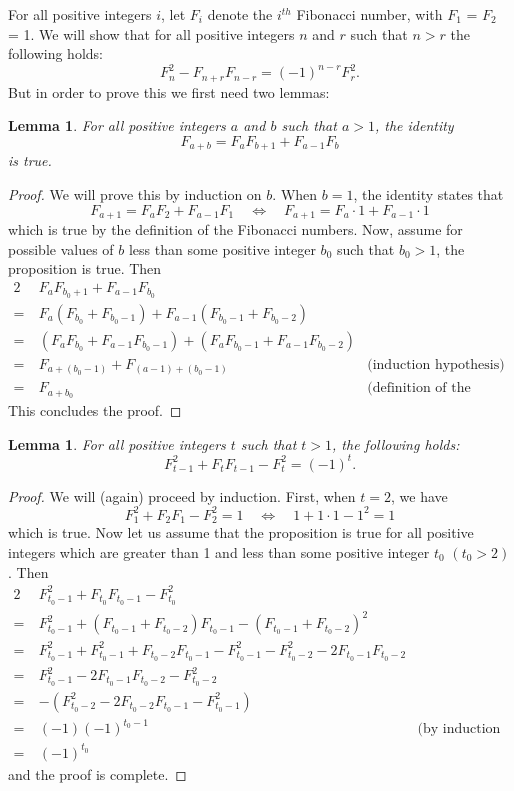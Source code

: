 \documentclass[12pt]{article}
\newtheorem{lem}[thm]{Lemma}
\theoremstyle{definition}
\theoremstyle{remark}
\numberwithin{equation}{section}
\begin{document}
For all positive integers $i$, let $F_{i}$ denote the $i^{th}$ Fibonacci number, with $F_{1}$ = $F_{2}$ = 1. We will show that for all positive integers $n$ and $r$ such that $n > r$ the following holds:
$$F_{n}^2 - F_{n + r}F_{n - r}=( - 1)^{n - r}F_{r}^2.$$
But in order to prove this we first need two lemmas: \begin{lem}
For all positive integers $a$ and $b$ such that $a>1$, the identity
$$F_{a + b} = F_{a}F_{b + 1} + F_{a - 1}F_{b}$$ is true. \end{lem}
\begin{proof} 
We will prove this by induction on $b$. When $b = 1$, the identity states that 
$$F_{a + 1} = F_{a}F_{2} + F_{a - 1}F_{1} \quad \Longleftrightarrow \quad F_{a + 1} = F_{a}\cdot 1 + F_{a - 1}\cdot 1$$
which is true by the definition  of the Fibonacci numbers.  Now, assume for possible values of $b$ less than some positive integer $b_{0}$ such that $b_{0}>1$, the proposition is true. Then
\begin{alignat*}{2}
& F_{a}F_{b_{0} + 1} + F_{a - 1}F_{b_{0}} & \\ 
=\ & F_{a}(F_{b_{0}} + F_{b_{0} - 1}) + F_{a - 1}(F_{b_{0} - 1} + F_{b_{0} - 2}) & \\
=\ & (F_{a}F_{b_{0}} + F_{a - 1}F_{b_{0} - 1}) + (F_{a}F_{b_{0} - 1} + F_{a - 1}F_{b_{0} - 2}) & \\
=\ & F_{a + (b_{0} - 1)} + F_{(a - 1) + (b_{0} - 1)} &  \mbox{(induction hypothesis)} \\
=\ & F_{a + b_{0}} & \mbox{(definition of the Fibonacci numbers)}
\end{alignat*}
This concludes the proof. \end{proof}
\begin{lem}
For all positive integers $t$ such that $t>1$, the following holds:
$$F_{t - 1}^2 + F_{t}F_{t - 1} - F_{t}^2 = ( - 1)^t.$$
\end{lem}
\begin{proof}
We will (again) proceed by induction. First, when $t=2$, we have
$$F_{1}^2 + F_{2}F_{1} - F_{2}^2=1 \quad \Longleftrightarrow \quad 1 + 1\cdot 1 - 1^2=1$$
which is true. Now let us assume that the proposition is true for
all positive integers which are greater than 1 and less than some
positive integer $t_{0}$ $(t_{0}>2)$. Then
\begin{alignat*}{2}
& F_{t_{0} - 1}^2 + F_{t_{0}}F_{t_{0} - 1} - F_{t_{0}}^2 & \\
=\ & F_{t_{0} - 1}^2  + (F_{t_{0} - 1} + F_{t_{0} - 2})F_{t_{0} - 1} - (F_{t_{0} - 1} + F_{t_{0} - 2})^2 & \\
=\ & F_{t_{0} - 1}^2  + F_{t_{0} - 1}^2 + F_{t_{0} - 2}F_{t_{0} - 1} - F_{t_{0} - 1}^2 - F_{t_{0} - 2}^2 - 2F_{t_{0} - 1}F_{t_{0} - 2} & \\
=\ & F_{t_{0} - 1}^2 - 2F_{t_{0} - 1}F_{t_{0} - 2} - F_{t_{0} - 2}^2 & \\
=\ & - (F_{t_{0} - 2}^2 - 2F_{t_{0} - 2}F_{t_{0} - 1} - F_{t_{0} - 1}^2) & \\
=\ &( - 1)( - 1)^{t_{0} - 1} & \mbox{(by induction hypothesis)} \\
=\ & ( - 1)^{t_{0}} 
\end{alignat*} and the proof is complete.
\end{proof}
\end{document}
